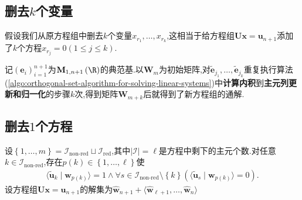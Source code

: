 \subsection*{删去$k$个变量}

假设我们从原方程组中删去$k$个变量$x_{r_{1}},\ldots,x_{r_{k}}$,这相当于给方程组$\boldsymbol{U}\boldsymbol{x}=\boldsymbol{u}_{n+1}$添加了$k$个方程$x_{r_{j}}=0\left(1\leq j\leq k\right)$.

记$\left(\boldsymbol{e}_{i}\right)_{i=1}^{n+1}$为$\mathbf{M}_{1,n+1}\left(\R\right)$的典范基.以$\boldsymbol{W}_{m}$为初始矩阵,对$\tilde{\boldsymbol{e}}_{j_{1}},\ldots,\tilde{\boldsymbol{e}}_{j_{k}}$重复执行算法(\ref{algo:orthogonal-set-algorithm-for-solving-linear-systems})中\textbf{计算内积}到\textbf{主元列更新和归一化}的步骤$k$次,得到矩阵$\boldsymbol{W}_{m+k}$后就得到了新方程组的通解.

\subsection*{删去$1$个方程}

设$\left\{1,\ldots,m\right\}=\mathcal{I}_{\text{non-red}}\sqcup\mathcal{I}_{\text{red}}$,其中$\left|\mathcal{I}\right|=\ell$是方程中剩下的主元个数.对任意$k\in\mathcal{I}_{\text{non-red}}$,存在$p\left(k\right)\in\left\{1,\ldots,\ell\right\}$使
\begin{align*}
	\langle\tilde{\boldsymbol{u}}_{k}\mid\boldsymbol{w}_{p\left(k\right)}\rangle=1\wedge\forall s\in\mathcal{I}_{\text{non-red}}\setminus\left\{k\right\}\left(\langle\tilde{\boldsymbol{u}}_{s}\mid\boldsymbol{w}_{p\left(k\right)}\rangle=0\right).
\end{align*}
设方程组$\boldsymbol{U}\boldsymbol{x}=\boldsymbol{u}_{n+1}$的解集为$\hat{\boldsymbol{w}}_{n+1}+\langle\hat{\boldsymbol{w}}_{\ell+1},\ldots,\hat{\boldsymbol{w}}_{n}\rangle$

